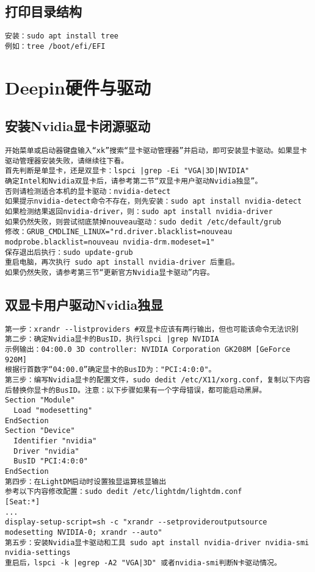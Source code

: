 \documentclass[a4paper,fontset=fandol,zihao=-4,linespread=1.2]{ctexbook}
\begin{document}
\section{打印目录结构}
\begin{lstlisting}
安装：sudo apt install tree
例如：tree /boot/efi/EFI
\end{lstlisting}


\chapter{Deepin硬件与驱动}

\section{安装Nvidia显卡闭源驱动}
\begin{lstlisting}
开始菜单或启动器键盘输入“xk”搜索“显卡驱动管理器”并启动，即可安装显卡驱动。如果显卡驱动管理器安装失败，请继续往下看。
首先判断是单显卡，还是双显卡：lspci |grep -Ei "VGA|3D|NVIDIA"
确定Intel和Nvidia双显卡后，请参考第二节“双显卡用户驱动Nvidia独显”。
否则请检测适合本机的显卡驱动：nvidia-detect
如果提示nvidia-detect命令不存在，则先安装：sudo apt install nvidia-detect
如果检测结果返回nvidia-driver，则：sudo apt install nvidia-driver
如果仍然失败，则尝试彻底禁掉nouveau驱动：sudo dedit /etc/default/grub
修改：GRUB_CMDLINE_LINUX="rd.driver.blacklist=nouveau modprobe.blacklist=nouveau nvidia-drm.modeset=1"
保存退出后执行：sudo update-grub
重启电脑，再次执行 sudo apt install nvidia-driver 后重启。
如果仍然失败，请参考第三节“更新官方Nvidia显卡驱动”内容。
\end{lstlisting}

\section{双显卡用户驱动Nvidia独显}
\begin{lstlisting}
第一步：xrandr --listproviders #双显卡应该有两行输出，但也可能该命令无法识别
第二步：确定Nvidia显卡的BusID，执行lspci |grep NVIDIA
示例输出：04:00.0 3D controller: NVIDIA Corporation GK208M [GeForce 920M]
根据行首数字“04:00.0”确定显卡的BusID为："PCI:4:0:0"。
第三步：编写Nvidia显卡的配置文件，sudo dedit /etc/X11/xorg.conf，复制以下内容后替换你显卡的BusID。注意：以下步骤如果有一个字母错误，都可能启动黑屏。
Section "Module"
  Load "modesetting"
EndSection
Section "Device"
  Identifier "nvidia"
  Driver "nvidia"
  BusID "PCI:4:0:0"
EndSection
第四步：在LightDM启动时设置独显运算核显输出
参考以下内容修改配置：sudo dedit /etc/lightdm/lightdm.conf
[Seat:*]
...
display-setup-script=sh -c "xrandr --setprovideroutputsource modesetting NVIDIA-0; xrandr --auto"
第五步：安装Nvidia显卡驱动和工具 sudo apt install nvidia-driver nvidia-smi nvidia-settings
重启后，lspci -k |egrep -A2 "VGA|3D" 或者nvidia-smi判断N卡驱动情况。
\end{lstlisting}
\end{document}
